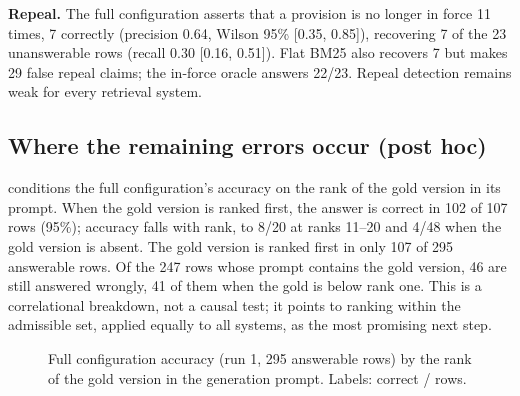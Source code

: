 \documentclass[sigconf,anonymous,review]{acmart}
\begin{document}
\textbf{Repeal.} The full configuration asserts that a provision is no longer in force 11 times, 7 correctly (precision 0.64, Wilson 95\% [0.35, 0.85]), recovering 7 of the 23 unanswerable rows (recall 0.30 [0.16, 0.51]). Flat BM25 also recovers 7 but makes 29 false repeal claims; the in-force oracle answers 22/23. Repeal detection remains weak for every retrieval system.

\subsection{Where the remaining errors occur (post hoc)}

 conditions the full configuration's accuracy on the rank of the gold version in its prompt. When the gold version is ranked first, the answer is correct in 102 of 107 rows (95\%); accuracy falls with rank, to 8/20 at ranks 11--20 and 4/48 when the gold version is absent. The gold version is ranked first in only 107 of 295 answerable rows. Of the 247 rows whose prompt contains the gold version, 46 are still answered wrongly, 41 of them when the gold is below rank one. This is a correlational breakdown, not a causal test; it points to ranking within the admissible set, applied equally to all systems, as the most promising next step.

\begin{figure}[t]
\centering
{}
\caption{Full configuration accuracy (run 1, 295 answerable rows) by the rank of the gold version in the generation prompt. Labels: correct / rows.}
\label{fig:rank}
\end{figure}
\end{document}
